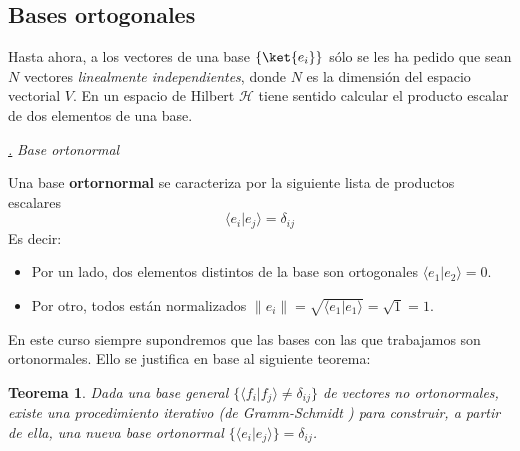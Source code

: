 \documentclass[a4paper,11pt]{book} %
\newtheorem{teorema_contador}{Teorema}
\newcommand{\Teorema}[1]{
		\begin{mybox_gray2}{}
			\begin{teorema_contador}
				 #1 
			\end{teorema_contador} 
		\end{mybox_gray2}
	}
\numberwithin{equation}{chapter}
\newcommand{\braket}[2]{\langle #1|#2\rangle}
\def\subsubiContadorIt{\par\addtocounter{subsubsection}{1}\underline{\it\thesubsubsection.}\hskip0.5cm \setcounter{subsubsubsectionIt}{0}}
\newcommand{\SubsubiIt}[1]{
		\subsubiContadorIt \textit{#1}
	}
\newcounter{subsubsubsectionIt}[subsubsection]
\begin{document}
		\subsection{Bases ortogonales}

Hasta ahora, a los vectores de una base $\{\ket{e_i}\}$ sólo se les ha pedido que sean $N$ vectores \textit{linealmente independientes}, donde $N$ es la dimensión del espacio vectorial $V$. En un espacio de Hilbert $\mathcal{H}$ tiene sentido calcular el producto escalar de dos elementos de una base. 


			\SubsubiIt{Base ortonormal}

	\begin{mybox_gray2}{}
Una base \textbf{ortornormal} se caracteriza por la siguiente lista de productos escalares
	\begin{equation}
	\braket{e_i}{e_j} = \delta_{ij}
	\end{equation}
Es decir:
\begin{itemize}
	\item Por un lado, dos elementos distintos de la base son ortogonales $\braket{e_1}{e_2} = 0$.
	\item Por otro, todos están normalizados  $ \| e_i \| = \sqrt{\braket{e_1}{e_1}} = \sqrt{1} = 1$.
\end{itemize}
	\end{mybox_gray2}

En este curso siempre supondremos que las bases con las que trabajamos son ortonormales. Ello se justifica en base al siguiente teorema:
	\Teorema{ \label{teorema_formalismo_gramm_schmidt}
	Dada una base general $\{\braket{f_i}{f_j}\neq \delta_{ij}\}$ de vectores no ortonormales, existe una procedimiento iterativo (de Gramm-Schmidt \cite{bib_wiki_GramSchmidt}) para construir, a partir de ella, una nueva base ortonormal $\{\braket{e_i}{e_j}\}=\delta_{ij}$.
	}
\end{document}
